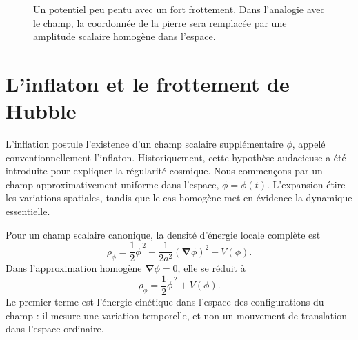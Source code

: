 \begin{figure}[htbp]
\centering
{}
\caption{Un potentiel peu pentu avec un fort frottement. Dans l’analogie avec le champ, la coordonnée de la pierre sera remplacée par une amplitude scalaire homogène dans l’espace.}
\label{fig:c08-shallow-potential}
\end{figure}

\section{L’inflaton et le frottement de Hubble}

L’inflation postule l’existence d’un champ scalaire supplémentaire \(\phi\), appelé conventionnellement l’inflaton. Historiquement, cette hypothèse audacieuse a été introduite pour expliquer la régularité cosmique. Nous commençons par un champ approximativement uniforme dans l’espace, \(\phi=\phi(t)\). L’expansion étire les variations spatiales, tandis que le cas homogène met en évidence la dynamique essentielle.

Pour un champ scalaire canonique, la densité d’énergie locale complète est
\begin{equation}
\rho_\phi
=
\frac12\dot\phi^{\,2}
+\frac{1}{2a^2}(\boldsymbol\nabla\phi)^2
+V(\phi).
\end{equation}Dans l’approximation homogène \(\boldsymbol\nabla\phi=0\), elle se réduit à
\begin{equation}
\rho_\phi=\frac12\dot\phi^{\,2}+V(\phi).
\label{eq:c08-scalar-density}
\end{equation}Le premier terme est l’énergie cinétique dans l’espace des configurations du champ : il mesure une variation temporelle, et non un mouvement de translation dans l’espace ordinaire.

\begin{classroomqa}
\end{classroomqa}


